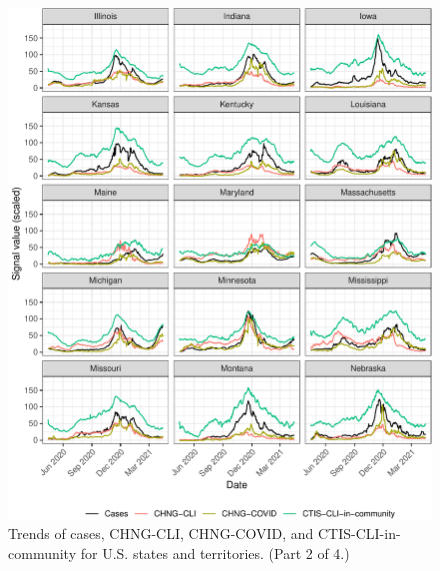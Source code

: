 \begin{figure}

{\centering \includegraphics[width=\textwidth]{fig/state-trend-grids-2-1}

}

\caption{Trends of cases, CHNG-CLI, CHNG-COVID, and CTIS-CLI-in-community for U.S. states and territories. (Part 2 of 4.)}\label{fig:state-trend-grids-2}
\end{figure}

\clearpage

